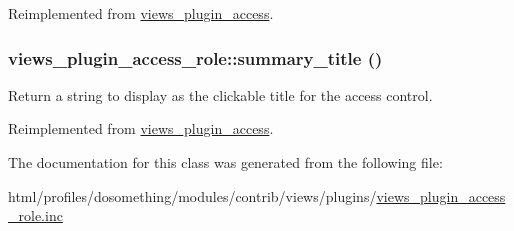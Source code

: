 Reimplemented from \hyperlink{classviews__plugin__access_a1ac0bea409be6ef8d7eb4bfafcf760c6}{views\_\-plugin\_\-access}.\hypertarget{classviews__plugin__access__role_a25dbbc0f06093f0e4ee13182ea0d277f}{
\subsubsection[{summary\_\-title}]{\setlength{\rightskip}{0pt plus 5cm}views\_\-plugin\_\-access\_\-role::summary\_\-title ()}}
\label{classviews__plugin__access__role_a25dbbc0f06093f0e4ee13182ea0d277f}
Return a string to display as the clickable title for the access control. 

Reimplemented from \hyperlink{classviews__plugin__access_ade500a95e599deffa417f8cbdd67bbf4}{views\_\-plugin\_\-access}.

The documentation for this class was generated from the following file:\begin{DoxyCompactItemize}
\item 
html/profiles/dosomething/modules/contrib/views/plugins/\hyperlink{views__plugin__access__role_8inc}{views\_\-plugin\_\-access\_\-role.inc}\end{DoxyCompactItemize}
